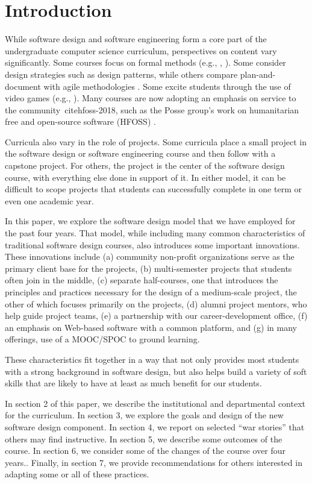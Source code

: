 
\section{Introduction}

While software design and software engineering form a core part of
the undergraduate computer science curriculum, perspectives on 
content vary significantly.  Some courses
focus on formal methods (e.g., \cite{liu-2009}, \cite{garcia-2014}).
Some consider design strategies such as design patterns, while others
compare plan-and-document with agile methodologies
\cite{gestwicki-2018}.  Some excite students through the use of
video games (e.g., \cite{wolz-2007}).  Many courses are now adopting
an emphasis on service to the community~cite{hfoss-2018}, 
such as the Posse group's work on
humanitarian free and open-source software (HFOSS) \cite{posse-2018}.

Curricula also vary in the role of projects.  Some curricula place
a small project in the software design or software engineering
course and then follow with a capstone project.  For others,
the project is the center of the software design course, with
everything else done in support of it. In either model, it can be difficult to 
scope projects that students can successfully complete 
in one term or even one academic year.

In this paper, we explore the software design model that we have
employed for the past four years.  That model, while including many
common characteristics of traditional software design courses, also
introduces some important innovations.  These innovations include
(a) community non-profit organizations serve as the primary client
base for the projects,
(b) multi-semester projects that students often join in the middle,
(c) separate half-courses, one that introduces
the principles and practices necessary for the design of a medium-scale
project, the other of which focuses primarily on the projects, 
(d) alumni project mentors, who help guide project teams, 
(e) a partnership with our career-development office, 
(f) an emphasis on Web-based software with a common platform, and 
(g) in many offerings, use of a MOOC/SPOC to ground learning.

These characteristics fit together in a way that not only provides
most students with a strong background in software design, but also
helps build a variety of soft skills that are likely to have at
least as much benefit for our students.

In section 2 of this paper, we describe the institutional and
departmental context for the curriculum.  In section 3, we explore
the goals and design of the new software design component.  In
section 4, we report on selected ``war stories'' that others may
find instructive.  In section 5, we describe some outcomes of the
course.  In section 6, we consider some of the changes of the course
over four years..  Finally, in section 7, we provide recommendations
for others interested in adapting some or all of these practices.

